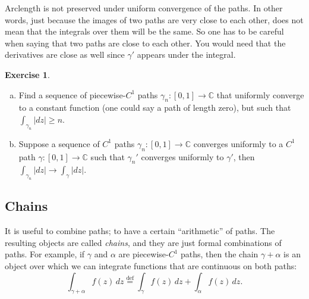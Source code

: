 \documentclass[12pt,openany]{book}
\newcommand{\sabs}[1]{\lvert {#1} \rvert}
\newcommand{\C}{{\mathbb{C}}}
\newcommand{\myquote}[1]{``#1''}
\theoremstyle{plain}
\theoremstyle{remark}
\theoremstyle{definition}
\newenvironment{exbox}{%
    \def\FrameCommand{\vrule width 1pt \relax\hspace{10pt}}%
    \MakeFramed{\advance\hsize-\width\FrameRestore}%
}{%
    \endMakeFramed
}
\newenvironment{exparts}{%
    \leavevmode\begin{enumerate}[a),noitemsep,topsep=0pt,parsep=0pt,partopsep=0pt]
}{%
    \end{enumerate}
}
\theoremstyle{exercise}
\newtheorem{exercise}{Exercise}[section]
\theoremstyle{example}
\begin{document}
Arclength is not preserved under uniform convergence of the paths.
In other words, just because the images of two paths are very close to each
other, does not mean that the integrals over them will be the same.
So one has to be careful when saying that two paths are close to each other.
You would need that the derivatives are close as well since $\gamma'$ appears
under the integral.

\begin{exbox}
\begin{exercise}
\begin{exparts}
\item
Find a sequence of piecewise-$C^1$ paths $\gamma_n \colon [0,1] \to \C$
that uniformly converge to a constant function (one could say a path of
length zero), but such that $\int_{\gamma_n} \sabs{dz} \geq n$.
\item
Suppose a sequence of $C^1$ paths $\gamma_n \colon [0,1] \to \C$
converges uniformly to a $C^1$ path $\gamma \colon [0,1] \to \C$
such that $\gamma_n'$ converges uniformly to $\gamma'$, then
$\int_{\gamma_n} \sabs{dz} \to
\int_{\gamma} \sabs{dz}$.
\end{exparts}
\end{exercise}
\end{exbox}

\subsection{Chains}

It is useful to combine paths; to have a certain \myquote{arithmetic} of paths.
The resulting objects are called \emph{chains}, and they
are just formal combinations of paths.  For example, if $\gamma$
and $\alpha$ are piecewise-$C^1$ paths, then the chain  $\gamma+\alpha$
is an object over which we can integrate functions that are continuous
on both paths:
\begin{equation*}
\int_{\gamma + \alpha} f(z) \, dz
\overset{\text{def}}{=}
\int_{\gamma} f(z) \, dz +
\int_{\alpha} f(z) \, dz .
\end{equation*}
\end{document}
